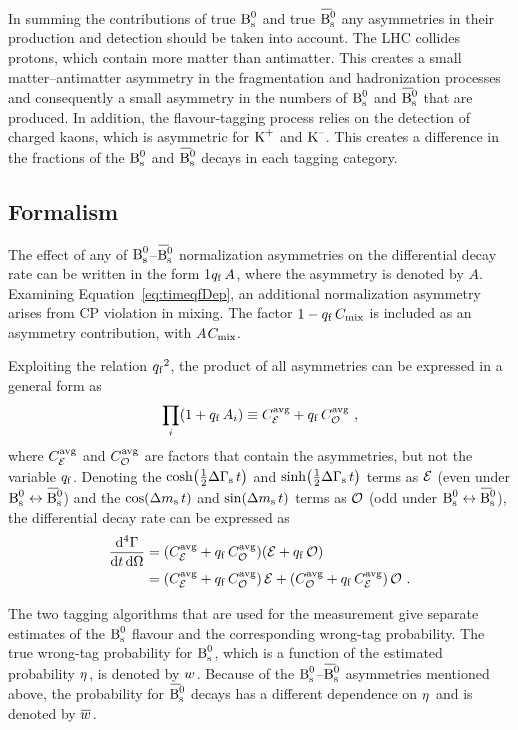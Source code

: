 In summing the contributions of true $\text{B}_\text{s}^\text{0}$ and true $\Bsbar$ any asymmetries in their production and detection should be taken into
account. The LHC collides protons, which contain more matter than antimatter. This creates a small matter--antimatter asymmetry in the
fragmentation and hadronization processes and consequently a small asymmetry in the numbers of $\text{B}_\text{s}^\text{0}$ and $\Bsbar$ that are produced. In
addition, the flavour-tagging process relies on the detection of charged kaons, which is asymmetric for $\text{K}^\text{+}$ and $\text{K}^\text{--}$. This creates a
difference in the fractions of the $\text{B}_\text{s}^\text{0}$ and $\Bsbar$ decays in each tagging category.


\subsection{Formalism}
\label{subsec:ana_tagging_form}

The effect of any of $\text{B}_\text{s}^\text{0}$--$\Bsbar$ normalization asymmetries on the differential decay rate can be written in the form 1\textplus${q_\mathrm{f}}\,
A$, where the asymmetry is denoted by $A$. Examining Equation~\ref{eq:timeqfDep}, an additional normalization asymmetry arises from CP
violation in mixing. The factor $1-{q_\mathrm{f}}\,C_\text{mix}$ is included as an asymmetry contribution, with $A$\texteq\tm$C_\text{mix}$.

Exploiting the relation ${q_\mathrm{f}}^2$\texteq{}, the product of all asymmetries can be expressed in a general form as
\begin{equation}
  \label{eq:asymProd}
  \prod_i (1+{q_\mathrm{f}}\, A_i) \equiv {\ensuremath{C_{\mathcal{E}_{}}^{\text{avg}}}} + {q_\mathrm{f}}\,{C_{\mathcal{O}_{}}^{\text{avg}}} \ ,
\end{equation}
where ${C_{\mathcal{E}_{}}^{\text{avg}}}$ and ${C_{\mathcal{O}_{}}^{\text{avg}}}$ are factors that contain the asymmetries, but not the variable ${q_\mathrm{f}}$. Denoting the $\cosh\!\left(\tfrac{1}{2}\Delta\Gamma_\text{s}\, t\right)$ and $\sinh\!\left(\tfrac{1}{2}\Delta\Gamma_\text{s}\, t\right)$
terms as $\mathcal{E}$ (even under $\Bs\leftrightarrow\Bsbar$) and the $\cos\!\left(\Delta m_\text{s}\, t\right)$ and $\sin\!\left(\Delta m_\text{s}\, t\right)$ terms as $\mathcal{O}$ (odd under
$\Bs\leftrightarrow\Bsbar$), the differential decay rate can be expressed as
\begin{equation}
  \label{eq:diffRateAsym}
  \begin{aligned}
    \frac{\mathrm{d}^4\Gamma}{\mathrm{d} t\, \mathrm{d}\Omega}
      &= ({C_{\mathcal{E}_{}}^{\text{avg}}} + {q_\mathrm{f}}\,{C_{\mathcal{O}_{}}^{\text{avg}}}) (\mathcal{E} + {q_\mathrm{f}}\,\mathcal{O}) \\
      &= ({C_{\mathcal{E}_{}}^{\text{avg}}} + {q_\mathrm{f}}\,{C_{\mathcal{O}_{}}^{\text{avg}}})\, \mathcal{E} + ({C_{\mathcal{O}_{}}^{\text{avg}}} + {q_\mathrm{f}}\,{C_{\mathcal{E}_{}}^{\text{avg}}})\, \mathcal{O} \ .
  \end{aligned}
\end{equation}

The two tagging algorithms that are used for the \BstoJpsiKK{} measurement give separate estimates of the $\text{B}_\text{s}^\text{0}$ flavour and the
corresponding wrong-tag probability. The true wrong-tag probability for $\text{B}_\text{s}^\text{0}$, which is a function of the estimated probability $\eta^{}$,
is denoted by $w^{}$. Because of the $\text{B}_\text{s}^\text{0}$--$\Bsbar$ asymmetries mentioned above, the probability for $\Bsbar$ decays has a different
dependence on $\eta^{}$ and is denoted by $\wTagBar$.

